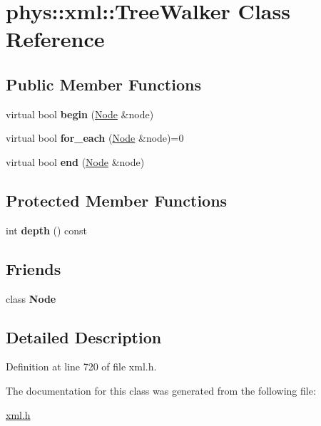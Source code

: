 \hypertarget{classphys_1_1xml_1_1TreeWalker}{
\section{phys::xml::TreeWalker Class Reference}
\label{d5/d8d/classphys_1_1xml_1_1TreeWalker}
}
\subsection*{Public Member Functions}
\begin{DoxyCompactItemize}
\item 
\hypertarget{classphys_1_1xml_1_1TreeWalker_a473f72ad29ac346043bb0420b0fb5c61}{
virtual bool {\bfseries begin} (\hyperlink{classphys_1_1xml_1_1Node}{Node} \&node)}
\label{d5/d8d/classphys_1_1xml_1_1TreeWalker_a473f72ad29ac346043bb0420b0fb5c61}

\item 
\hypertarget{classphys_1_1xml_1_1TreeWalker_a7fc883fd9b8eeff896c8822cf5b514d3}{
virtual bool {\bfseries for\_\-each} (\hyperlink{classphys_1_1xml_1_1Node}{Node} \&node)=0}
\label{d5/d8d/classphys_1_1xml_1_1TreeWalker_a7fc883fd9b8eeff896c8822cf5b514d3}

\item 
\hypertarget{classphys_1_1xml_1_1TreeWalker_a8db754fbc392811dedc82f8e651ec971}{
virtual bool {\bfseries end} (\hyperlink{classphys_1_1xml_1_1Node}{Node} \&node)}
\label{d5/d8d/classphys_1_1xml_1_1TreeWalker_a8db754fbc392811dedc82f8e651ec971}

\end{DoxyCompactItemize}
\subsection*{Protected Member Functions}
\begin{DoxyCompactItemize}
\item 
\hypertarget{classphys_1_1xml_1_1TreeWalker_ab2693802beae6312239507a679e2624a}{
int {\bfseries depth} () const }
\label{d5/d8d/classphys_1_1xml_1_1TreeWalker_ab2693802beae6312239507a679e2624a}

\end{DoxyCompactItemize}
\subsection*{Friends}
\begin{DoxyCompactItemize}
\item 
\hypertarget{classphys_1_1xml_1_1TreeWalker_a6db9d28bd448a131448276ee03de1e6d}{
class {\bfseries Node}}
\label{d5/d8d/classphys_1_1xml_1_1TreeWalker_a6db9d28bd448a131448276ee03de1e6d}

\end{DoxyCompactItemize}


\subsection{Detailed Description}


Definition at line 720 of file xml.h.



The documentation for this class was generated from the following file:\begin{DoxyCompactItemize}
\item 
\hyperlink{xml_8h}{xml.h}\end{DoxyCompactItemize}
